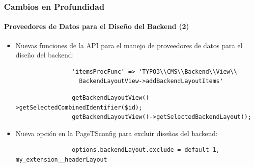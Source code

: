 
\begin{frame}[fragile]
	\frametitle{Cambios en Profundidad}
	\framesubtitle{Proveedores de Datos para el Diseño del Backend (2)}

	\begin{itemize}
		\item Nuevas funciones de la API para el manejo de proveedores de datos para el diseño del backend:

			\begin{lstlisting}
				'itemsProcFunc' => 'TYPO3\\CMS\\Backend\\View\\
				  BackendLayoutView->addBackendLayoutItems'
			\end{lstlisting}

			\begin{lstlisting}
				getBackendLayoutView()->getSelectedCombinedIdentifier($id);
				getBackendLayoutView()->getSelectedBackendLayout();
			\end{lstlisting}

		\item Nueva opción en la PageTSconfig para excluir diseños del backend:

			\begin{lstlisting}
				options.backendLayout.exclude = default_1, my_extension__headerLayout
			\end{lstlisting}

	\end{itemize}

\end{frame}


